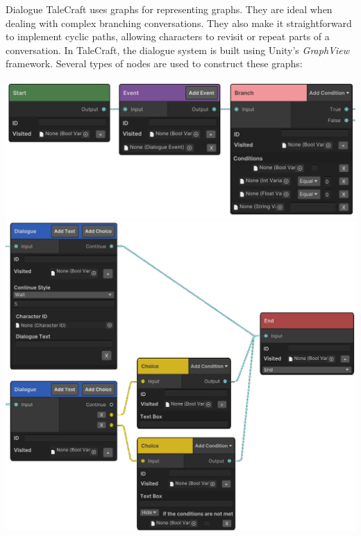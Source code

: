 \documentclass[portrait,a0paper,fontscale=0.33]{baposter}
\begin{document}
\begin{poster}
\begin{posterbox}[column=1, span=1, name=ds, below=is, %
]{Dialogue}
TaleCraft uses graphs for representing graphs. They are ideal when dealing with complex branching conversations. They also make it straightforward to implement cyclic paths, allowing characters to revisit or repeat parts of a conversation. In TaleCraft, the dialogue system is built using Unity’s \textit{GraphView} framework. Several types of nodes are used to construct these graphs: 

\begin{center}
\includegraphics[width=0.65\linewidth]{img/nodes1.png}
\includegraphics[width=0.7\linewidth]{img/nodes2.png}
\end{center}

\end{posterbox}



\end{poster}
\end{document}

